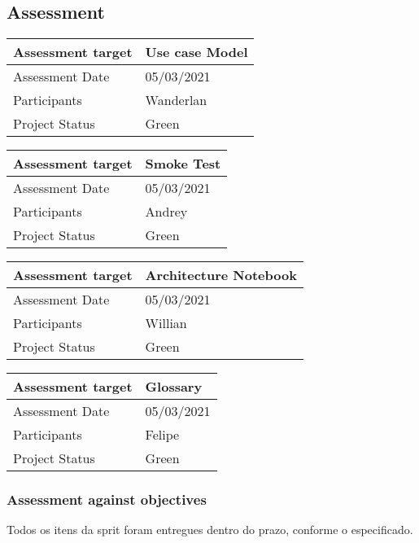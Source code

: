 \subsection*{Assessment}
%


\noindent\begin{tabular}{|l|l|}
\hline
Assessment target & Use case Model\\\hline
Assessment Date & 05/03/2021\\\hline
Participants & Wanderlan \\\hline
Project Status & Green\\\hline
\end{tabular}

\noindent\begin{tabular}{|l|l|}
\hline
Assessment target & Smoke Test\\\hline
Assessment Date & 05/03/2021\\\hline
Participants & Andrey \\\hline
Project Status & Green\\\hline
\end{tabular}

\noindent\begin{tabular}{|l|l|}
\hline
Assessment target & Architecture Notebook\\\hline
Assessment Date & 05/03/2021\\\hline
Participants & Willian \\\hline
Project Status & Green\\\hline
\end{tabular}

\noindent\begin{tabular}{|l|l|}
\hline
Assessment target & Glossary\\\hline
Assessment Date & 05/03/2021\\\hline
Participants & Felipe \\\hline
Project Status & Green\\\hline
\end{tabular}

\subsubsection*{Assessment against objectives}
Todos os itens da sprit foram entregues dentro do prazo, conforme o especificado. 

